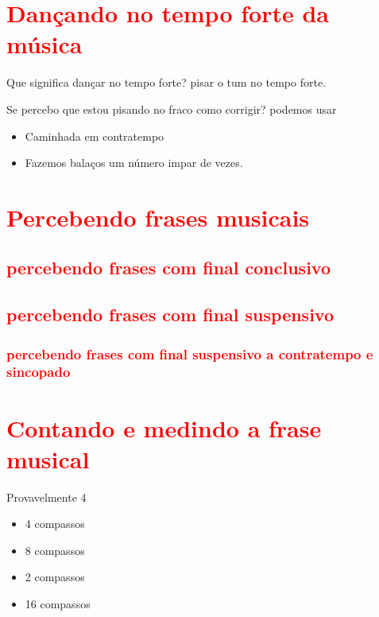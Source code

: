 \section{\textcolor{red}{Dançando no tempo forte da música}}

Que significa dançar no tempo forte? 
pisar o tum  no tempo forte.

Se percebo que estou pisando no fraco como corrigir?
podemos usar
\begin{itemize}
\item Caminhada em contratempo
\item Fazemos balaços um número impar de vezes.
\end{itemize}


\section{\textcolor{red}{Percebendo frases musicais}}

\subsection{\textcolor{red}{percebendo frases com final conclusivo}}
\subsection{\textcolor{red}{percebendo frases com final suspensivo}}
\subsubsection{\textcolor{red}{percebendo frases com final suspensivo a contratempo e sincopado}}

\section{\textcolor{red}{Contando e medindo a frase musical}}
Provavelmente 4
\begin{itemize}
\item 4 compassos
\item 8 compassos
\item 2 compassos
\item 16 compassos
\end{itemize}

